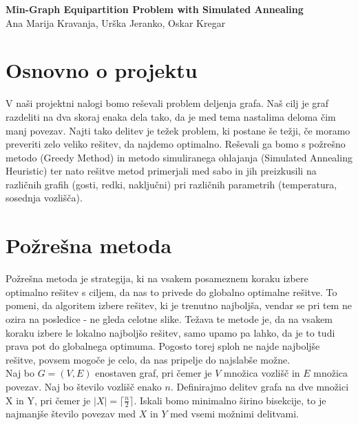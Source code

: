 \documentclass[12pt,a4paper]{amsart}
\theoremstyle{definition} %
\theoremstyle{plain} %
\newcommand{\naslovdela}{Min-Graph Equipartition Problem with Simulated Annealing}
\newcommand{\letnica}{2019}
\begin{document}
\thispagestyle{empty}
\vfill

\begin{center}{\large
{\bf \naslovdela}\\[10mm]
Ana Marija Kravanja, Urška Jeranko, Oskar Kregar}\\[1cm]

\end{center}
\vfill

\noindent{\large
Ljubljana, \letnica}
\pagebreak


\section{Osnovno o projektu}
V naši projektni nalogi bomo reševali problem deljenja grafa. Naš cilj je graf razdeliti na dva skoraj enaka dela tako, da je med tema nastalima deloma čim manj povezav. Najti tako delitev je težek problem, ki postane še težji, če moramo preveriti zelo veliko rešitev, da najdemo optimalno. Reševali ga bomo s požrešno metodo (Greedy Method) in metodo simuliranega ohlajanja (Simulated Annealing Heuristic) ter nato rešitve metod primerjali med sabo in jih preizkusili na različnih grafih (gosti, redki, naključni) pri različnih parametrih (temperatura, sosednja vozlišča). 

\section{Požrešna metoda}
Požrešna metoda je strategija, ki na vsakem posameznem koraku izbere optimalno rešitev s ciljem, da nas to privede do globalno optimalne rešitve. To pomeni, da algoritem izbere rešitev, ki je trenutno najboljša, vendar se pri tem ne ozira na posledice - ne gleda celotne slike. Težava te metode je, da na vsakem koraku izbere le lokalno najboljšo rešitev, samo upamo pa lahko, da je to tudi prava pot do globalnega optimuma. Pogosto torej sploh ne najde najboljše rešitve, povsem mogoče je celo, da nas pripelje do najslabše možne. \\

Naj bo $G=(V,E)$ enostaven graf, pri čemer je $V$ množica vozlišč in $E$ množica povezav. Naj bo število vozlišč enako $n$. Definirajmo delitev grafa na dve množici X in Y, pri čemer je $|X| = \lceil \frac{n}{2} \rceil$. Iskali bomo minimalno širino bisekcije, to je najmanjše število povezav med $X$ in $Y$ med vsemi možnimi delitvami. 
\end{document}
